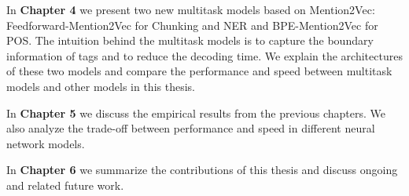 In \textbf{Chapter 4} we present two new multitask models based on Mention2Vec: Feedforward-Mention2Vec for Chunking and NER and BPE-Mention2Vec for POS. The intuition behind the multitask models is to capture the boundary information of tags and to reduce the decoding time. We explain the architectures of these two models and compare the performance and speed between multitask models and other models in this thesis.

In \textbf{Chapter 5} we discuss the empirical results from the previous chapters. We also analyze the trade-off between performance and speed in different neural network models.

In \textbf{Chapter 6} we summarize the contributions of this thesis and discuss ongoing and related future work.